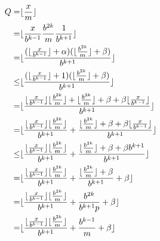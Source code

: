 \documentclass{article}
\DeclarePairedDelimiter\floor{\lfloor}{\rfloor}
\begin{document}
\begin{align*}
    Q = & \floor{\frac{x}{m}}\\ 
    = & \floor{\frac{x}{b^{k-1}}\frac{b^{2k}}{m}\frac{1}{b^{k+1}}} \\
    = & \floor{
        \frac
        {
            (\floor{\frac{x}{b^{k-1}}} + \alpha
            )
            (
            \floor{\frac{b^{2k}}{m}} + \beta
            )
        }
        {b ^{k+1}}
    } \\
    \le & \floor{
        \frac
        {
            (\floor{\frac{x}{b^{k-1}}} + 1
            )
            (
            \floor{\frac{b^{2k}}{m}} + \beta
            )
        }
        {b ^{k+1}}
    } \\ 
    = & \floor{
        \frac
        {
            \floor{\frac{x}{b^{k-1}}} \floor{\frac{b^{2k}}{m}} + \floor{\frac{b^{2k}}{m}} + \beta + \beta \floor{\frac{x}{b^{k-1}}}
        }
        {b ^{k+1}}
    } \\ 
    = & \floor{
        \frac
        {
            \floor{\frac{x}{b^{k-1}}} \floor{\frac{b^{2k}}{m}}
        }
        {b ^{k+1}}
        +
        \frac
        {
            \floor{\frac{b^{2k}}{m}} + \beta + \beta \floor{\frac{x}{b^{k-1}}}
        }
        {b ^{k+1}}
    } \\
    \le & \floor{
        \frac
        {
            \floor{\frac{x}{b^{k-1}}} \floor{\frac{b^{2k}}{m}}
        }
        {b ^{k+1}}
        +
        \frac
        {
            \floor{\frac{b^{2k}}{m}} + \beta + \beta {b^{k+1}}
        }
        {b ^{k+1}}
    } \\
    = & \floor{
        \frac
        {
            \floor{\frac{x}{b^{k-1}}} \floor{\frac{b^{2k}}{m}}
        }
        {b ^{k+1}}
        +
        \frac
        {
            \floor{\frac{b^{2k}}{m}} + \beta
        }
        {b ^{k+1}} + \beta
    } \\
    = & \floor{
        \frac
        {
            \floor{\frac{x}{b^{k-1}}} \floor{\frac{b^{2k}}{m}}
        }
        {b ^{k+1}}
        +
        \frac
        {
            b^{2k}
        }
        {b ^{k+1}p} + \beta
    } \\
    = & \floor{
        \frac
        {
            \floor{\frac{x}{b^{k-1}}} \floor{\frac{b^{2k}}{m}}
        }
        {b ^{k+1}}
        +
        \frac
        {
            b^{k-1}
        }
        {m} + \beta
    } \\ 
\end{align*}
\end{document}
